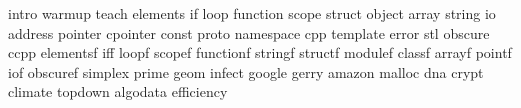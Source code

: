 intro
warmup
teach
elements
if
loop
function
scope
struct
object
array
string
io
address
pointer
cpointer
const
proto
namespace
cpp
template
error
stl
obscure
ccpp
elementsf
iff
loopf
scopef
functionf
stringf
structf
modulef
classf
arrayf
pointf
iof
obscuref
simplex
prime
geom
infect
google
gerry
amazon
malloc
dna
crypt
climate
topdown
algodata
efficiency
